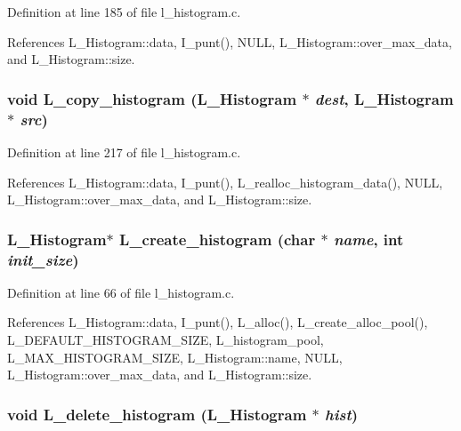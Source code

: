 Definition at line 185 of file l\_\-histogram.c.

References L\_\-Histogram::data, I\_\-punt(), NULL, L\_\-Histogram::over\_\-max\_\-data, and L\_\-Histogram::size.
\subsubsection{\setlength{\rightskip}{0pt plus 5cm}void L\_\-copy\_\-histogram (\bf{L\_\-Histogram} $\ast$ {\em dest}, \bf{L\_\-Histogram} $\ast$ {\em src})}\label{l__histogram_8c_6acd9401da26009bbc8dac37cc870832}




Definition at line 217 of file l\_\-histogram.c.

References L\_\-Histogram::data, I\_\-punt(), L\_\-realloc\_\-histogram\_\-data(), NULL, L\_\-Histogram::over\_\-max\_\-data, and L\_\-Histogram::size.
\subsubsection{\setlength{\rightskip}{0pt plus 5cm}\bf{L\_\-Histogram}$\ast$ L\_\-create\_\-histogram (char $\ast$ {\em name}, int {\em init\_\-size})}\label{l__histogram_8c_26baf7ecd630d5d344b1b385b11b4370}




Definition at line 66 of file l\_\-histogram.c.

References L\_\-Histogram::data, I\_\-punt(), L\_\-alloc(), L\_\-create\_\-alloc\_\-pool(), L\_\-DEFAULT\_\-HISTOGRAM\_\-SIZE, L\_\-histogram\_\-pool, L\_\-MAX\_\-HISTOGRAM\_\-SIZE, L\_\-Histogram::name, NULL, L\_\-Histogram::over\_\-max\_\-data, and L\_\-Histogram::size.
\subsubsection{\setlength{\rightskip}{0pt plus 5cm}void L\_\-delete\_\-histogram (\bf{L\_\-Histogram} $\ast$ {\em hist})}\label{l__histogram_8c_ce5a89ddb2e5c6bb37fc8cb817f78dfe}




